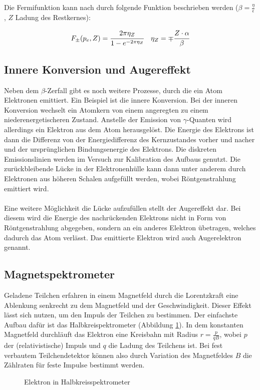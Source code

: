Die Fermifunktion kann nach \cite{fermi} durch folgende Funktion beschrieben werden ($\beta = \frac{\eta}{\epsilon}$, $Z$ Ladung des Restkernes):

\begin{align}
F_\pm(p_e,Z) &= \cfrac{2\pi\eta_Z}{1-e^{-2\pi\eta_Z}} & \eta_Z = \mp \cfrac{Z\cdot \alpha}{\beta}
\label{equ:fermi}
\end{align}


\subsection{Innere Konversion und Augereffekt}
Neben dem $\beta$-Zerfall gibt es noch weitere Prozesse, durch die ein Atom Elektronen emittiert. Ein Beispiel ist die innere Konversion. Bei der inneren Konversion wechselt ein Atomkern von einem angeregten zu einem niederenergetischeren Zustand. Anstelle der Emission von $\gamma$-Quanten wird allerdings ein Elektron aus dem Atom herausgelöst. Die Energie des Elektrons ist dann die Differenz von der Energiedifferenz des Kernzustandes vorher und nacher und der ursprünglichen Bindungsenergie des Elektrons. Die diskreten Emissionslinien werden im Versuch zur Kalibration des Aufbaus genutzt. Die zurückbleibende Lücke in der Elektronenhülle kann dann unter anderem durch Elektronen aus höheren Schalen aufgefüllt werden, wobei Röntgenstrahlung emittiert wird.\\ \\
Eine weitere Möglichkeit die Lücke aufzufüllen stellt der Augereffekt dar. Bei diesem wird die Energie des nachrückenden Elektrons nicht in Form von Röntgenstrahlung abgegeben, sondern an ein anderes Elektron übetragen, welches dadurch das Atom verlässt. Das emittierte Elektron wird auch Augerelektron genannt.

\subsection{Magnetspektrometer}
Geladene Teilchen erfahren in einem Magnetfeld durch die Lorentzkraft eine Ablenkung senkrecht zu dem Magnetfeld und der Geschwindigkeit. Dieser Effekt lässt sich nutzen, um den Impuls der Teilchen zu bestimmen. Der einfachste Aufbau dafür ist das Halbkreispektrometer (Abbildung \ref{fig:halbkreis}). In dem konstanten Magnetfeld durchläuft das Elektron eine Kreisbahn mit Radius $r=\frac{p}{qB}$, wobei $p$ der (relativistische) Impuls und $q$ die Ladung des Teilchens ist. Bei fest verbautem Teilchendetektor können also durch Variation des Magnetfeldes $B$ die Zählraten für feste Impulse bestimmt werden.
\begin{figure}[h]
  \centering
  \caption{Elektron in Halbkreisspektrometer}
  \label{fig:halbkreis}
\end{figure}

